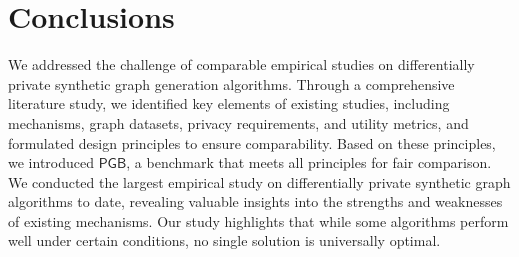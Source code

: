 \documentclass[conference]{IEEEtran}
\theoremstyle{plain}
\begin{document}
\begin{table}[t]
\small
   \caption{Comparison of Memory Consumption (Megatypes).}
	\label{tab:memory cost}
	\centering
\end{table}

\section{Conclusions}
\label{sec:conclusion}

We addressed the challenge of comparable empirical studies on differentially private synthetic graph generation algorithms. 
Through a comprehensive literature study, we identified key elements of existing studies, including mechanisms, graph datasets, privacy requirements, and utility metrics, and formulated design principles to ensure comparability. 
Based on these principles, we introduced $\mathsf{PGB}$, a benchmark that meets all principles for fair comparison. 
We conducted the largest empirical study on differentially private synthetic graph algorithms to date, revealing valuable insights into the strengths and weaknesses of existing mechanisms. 
Our study highlights that while some algorithms perform well under certain conditions, no single solution is universally optimal. 
\end{document}
